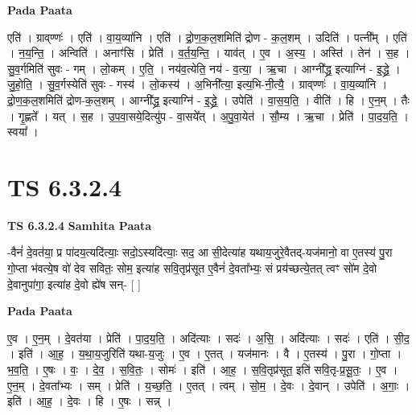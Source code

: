 \documentclass[17pt]{extarticle}
\begin{document}
\textbf{Pada Paata} \newline

एति॑ । ग्राव्‌ण्णः॑ । एति॑ । वा॒य॒व्या॑नि । एति॑ । द्रो॒ण॒क॒ल॒शमिति॑ द्रोण - क॒ल॒शम् । उदिति॑ । पत्नी᳚म् । एति॑ । न॒य॒न्ति॒ । अन्विति॑ । अनाꣳ॑सि । प्रेति॑ । व॒र्त॒य॒न्ति॒ । याव॑त् । ए॒व । अ॒स्य॒ । अस्ति॑ । तेन॑ । स॒ह । सु॒व॒र्गमिति॑ सुवः - गम् । लो॒कम् । ए॒ति॒ । नय॑व॒त्येति॒ नय॑ - व॒त्या॒ । ऋ॒चा । आग्नी᳚द्ध्र॒ इत्याग्नि॑ - इ॒द्ध्रे॒ । जु॒हो॒ति॒ । सु॒व॒र्गस्येति॑ सुवः - गस्य॑ । लो॒कस्य॑ । अ॒भिनी᳚त्या॒ इत्य॒भि-नी॒त्यै॒ । ग्राव्‌ण्णः॑ । वा॒य॒व्या॑नि । द्रो॒ण॒क॒ल॒शमिति॑ द्रोण-क॒ल॒शम् । आग्नी᳚द्ध्र॒ इत्याग्नि॑ - इ॒द्ध्रे॒ । उपेति॑ । वा॒स॒य॒ति॒ । वीति॑ । हि । ए॒न॒म् । तैः । गृ॒ह्णते᳚ । यत् । स॒ह । उ॒प॒वा॒सये॒दित्यु॑प - वा॒सये᳚त् । अ॒पु॒वा॒येत॑ । सौ॒म्य । ऋ॒चा । प्रेति॑ । पा॒द॒य॒ति॒ । स्वया᳚ ।  \newline





\section{ TS 6.3.2.4 }

\textbf{TS 6.3.2.4 } \newline
\textbf{Samhita Paata} \newline

-वैनं॑ दे॒वत॑या॒ प्र पा॑दय॒त्यदि॑त्याः॒ सदो॒ऽस्यदि॑त्याः॒ सद॒ आ सी॒देत्या॑ह यथाय॒जुरे॒वैतद्-यज॑मानो॒ वा ए॒तस्य॑ पु॒रा गो॒प्ता भ॑वत्ये॒ष वो॑ देव सवितः॒ सोम॒ इत्या॑ह सवि॒तृप्र॑सूत ए॒वैनं॑ दे॒वता᳚भ्यः॒ सं प्रय॑च्छत्ये॒तत् त्वꣳ सो॑म दे॒वो दे॒वानुपा॑गा॒ इत्या॑ह दे॒वो ह्ये॑ष सन्- [  ] \newline

\textbf{Pada Paata} \newline

ए॒व । ए॒न॒म् । दे॒वत॑या । प्रेति॑ । पा॒द॒य॒ति॒ । अदि॑त्याः । सदः॑ । अ॒सि॒ । अदि॑त्याः । सदः॑ । एति॑ । सी॒द॒ । इति॑ । आ॒ह॒ । य॒था॒य॒जुरिति॑ यथा-य॒जुः । ए॒व । ए॒तत् । यज॑मानः । वै । ए॒तस्य॑ । पु॒रा । गो॒प्ता । भ॒व॒ति॒ । ए॒षः । वः॒ । दे॒व॒ । स॒वि॒तः॒ । सोमः॑ । इति॑ । आ॒ह॒ । स॒वि॒तृप्र॑सूत॒ इति॑ सवि॒तृ-प्र॒सू॒तः॒ । ए॒व । ए॒न॒म् । दे॒वता᳚भ्यः । सम् । प्रेति॑ । य॒च्छ॒ति॒ । ए॒तत् । त्वम् । सो॒म॒ । दे॒वः । दे॒वान् । उपेति॑ । अ॒गाः॒ । इति॑ । आ॒ह॒ । दे॒वः । हि । ए॒षः । सन्न् ।  \newline




\end{document}

